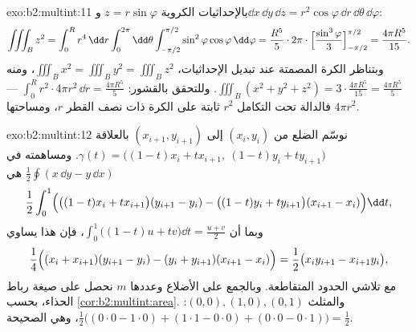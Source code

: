 \begin{solution}{exo:b2:multint:11}
بالإحداثيات الكروية $z = r\sin\varphi$ و$\dd x\,\dd
y\,\dd z = r^2\cos\varphi\,\dd r\,\dd\theta\,\dd\varphi$:
\[
\iiint_B z^2
= \int_0^R r^4\,\dd r\int_0^{2\pi}\dd\theta
\int_{-\pi/2}^{\pi/2}\sin^2\varphi\cos\varphi\,\dd\varphi
= \frac{R^5}5\cdot2\pi\cdot
\Bigl[\frac{\sin^3\varphi}3\Bigr]_{-\pi/2}^{\pi/2}
= \frac{4\pi R^5}{15}.
\]
وبتناظر الكرة المصمتة عند تبديل الإحداثيات، $\iiint_B x^2 = \iiint_B y^2 = \iiint_B z^2$، ومنه $\iiint_B(x^2
+ y^2 + z^2) = 3\cdot\frac{4\pi R^5}{15} = \frac{4\pi R^5}5$.
وللتحقق بالقشور: $\int_0^R r^2\cdot 4\pi r^2\,\dd r = \frac{4\pi
R^5}5$ --- فالدالة تحت التكامل $r^2$ ثابتة على
الكرة ذات نصف القطر $r$، ومساحتها $4\pi r^2$.
\end{solution}

\begin{solution}{exo:b2:multint:12}
نوسّم الضلع من $(x_i, y_i)$ إلى $(x_{i+1}, y_{i+1})$ بالعلاقة $\gamma(t) = \bigl((1-t)x_i + tx_{i+1},\ (1-t)y_i +
ty_{i+1}\bigr)$. ومساهمته في
$\frac12\oint(x\,\dd y - y\,\dd x)$ هي
\[
\frac12\int_0^1\Bigl(\bigl((1-t)x_i +
tx_{i+1}\bigr)(y_{i+1} - y_i) - \bigl((1-t)y_i +
ty_{i+1}\bigr)(x_{i+1} - x_i)\Bigr)\dd t ,
\]
وبما أن $\int_0^1\bigl((1-t)u + tv\bigr)\dd t = \frac{u +
v}2$، فإن هذا يساوي
\[
\frac14\Bigl((x_i + x_{i+1})(y_{i+1} - y_i) - (y_i +
y_{i+1})(x_{i+1} - x_i)\Bigr)
= \frac12\bigl(x_iy_{i+1} - x_{i+1}y_i\bigr),
\]
مع تلاشي الحدود المتقاطعة. وبالجمع على الأضلاع وعددها $m$ نحصل
على صيغة رباط الحذاء، بحسب \cref{cor:b2:multint:area}. والمثلث $(0,0), (1,0), (0,1)$: $\frac12\bigl((0\cdot0 - 1\cdot0) +
(1\cdot1 - 0\cdot0) + (0\cdot0 - 0\cdot1)\bigr) = \frac12$، وهي
 الصحيحة.
\end{solution}


